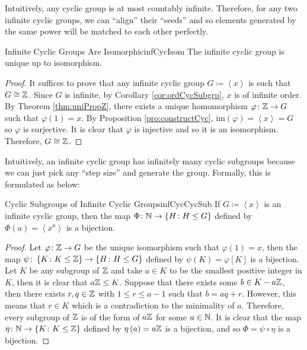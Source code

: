 \documentclass[math]{amznotes}
\theoremstyle{remark}
\newcommand{\img}[1]{\mathrm{im}\left(#1\right)}
\newcommand{\0}{\mathbf{0}}
\newcommand{\1}{\mathbf{1}}
\begin{document}
Intuitively, any cyclic group is at most countably infinite. Therefore, for any two infinite cyclic groups, we can ``align'' their ``seeds'' and so elements generated by the same power will be matched to each other perfectly.
\begin{corbox}{Infinite Cyclic Groups Are Isomorphic}{infCycIsom}
    The infinite cyclic group is unique up to isomorphism. 
    \tcblower
    \begin{proof}
        It suffices to prove that any infinite cyclic group $G \coloneqq \left\langle x \right\rangle$ is such that $G \cong \mathbb{Z}$. Since $G$ is infinite, by Corollary \ref{cor:ordCycSubgrp}, $x$ is of infinite order. By Theorem \ref{thm:uniPropZ}, there exists a unique homomorphism $\varphi \colon \mathbb{Z} \to G$ such that $\varphi\left(1\right) = x$. By Proposition \ref{pro:constructCyc}, $\img{\varphi} = \left\langle x \right\rangle = G$ so $\varphi$ is surjective. It is clear that $\varphi$ is injective and so it is an isomorphism. Therefore, $G \cong \mathbb{Z}$.
    \end{proof}
\end{corbox}
Intuitively, an infinite cyclic group has infinitely many cyclic subgroups because we can just pick any ``step size'' and generate the group. Formally, this is formulated as below:
\begin{probox}{Cyclic Subgroups of Infinite Cyclic Groups}{infCycCycSub}
    If $G \coloneqq \left\langle x \right\rangle$ is an infinite cyclic group, then the map $\Phi \colon \mathbb{N} \to \left\{H \colon H \leq G\right\}$ defined by $\Phi\left(a\right) = \left\langle x^a \right\rangle$ is a bijection.
    \tcblower
    \begin{proof}
        Let $\varphi \colon \mathbb{Z} \to G$ be the unique isomorphism such that $\varphi\left(1\right) = x$, then the map $\psi \colon \left\{K \colon K \leq \mathbb{Z}\right\} \to \left\{H \colon H \leq G\right\}$ defined by $\psi\left(K\right) = \varphi\left[K\right]$ is a bijection. Let $K$ be any subgroup of $\mathbb{Z}$ and take $a \in K$ to be the smallest positive integer in $K$, then it is clear that $a\mathbb{Z} \leq K$. Suppose that there exists some $b \in K - a\mathbb{Z}$, then there exists $r, q \in \mathbb{Z}$ with $1 \leq r \leq a - 1$ such that $b = aq + r$. However, this means that $r \in K$ which is a contradiction to the minimality of $a$. Therefore, every subgroup of $\mathbb{Z}$ is of the form of $a\mathbb{Z}$ for some $a \in \mathbb{N}$. It is clear that the map $\eta \colon \mathbb{N} \to \left\{K \colon K \leq \mathbb{Z}\right\}$ defined by $\eta\left(a\right) = a\mathbb{Z}$ is a bijection, and so $\Phi = \psi \circ \eta$ is a bijection.
    \end{proof}
\end{probox}
\end{document}

